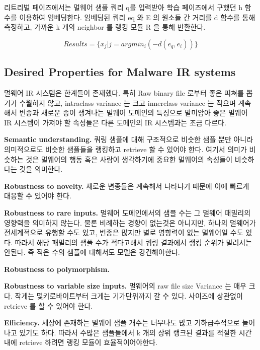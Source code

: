 리트리벌 페이즈에서는 멀웨어 샘플 쿼리 q를 입력받아 학습 페이즈에서 구했던 h 함수를 이용하여 임베딩한다. 임베딩된 쿼리 eq 와 E 의 원소들 간 거리를 d 함수를 통해 측정하고, 가까운 k 개의 neighbor 를 랭킹 모듈 R 을 통해 반환한다. 

\[
Results = \{x_j | j = argmin_i( {-d(e_q, e_i)} )  \}
\]

\subsection{Desired Properties for Malware IR systems}
멀웨어 IR 시스템은 한계들이 존재했다. 특히 Raw binary file 로부터 좋은 피쳐를 뽑기가 수월하지 않고, intraclass variance 는 크고 innerclass variance 는 작으며 계속해서 변종과 새로운 종이 생겨나는 멀웨어 도메인의 특징으로 말미암아 좋은 멀웨어 IR 시스템이 가져야 할 속성들은 다른 도메인의 IR 시스템과는 조금 다르다.

\textbf{Semantic understanding. }
쿼링 샘플에 대해 구조적으로 비슷한 샘플 뿐만 아니라 의미적으로도 비슷한 샘플들을 랭킹하고 retrieve 할 수 있어야 한다. 여기서 의미가 비슷하는 것은 멀웨어의 행동 혹은 사람이 생각하기에 중요한 멀웨어의 속성들이 비슷하다는 것을 의미한다. 


\textbf{Robustness to novelty. }
새로운 변종들은 계속해서 나타나기 때문에 이에 빠르게 대응할 수 있어야 한다. 


\textbf{Robustness to rare inputs. }
멀웨어 도메인에서의 샘플 수는 그 멀웨어 패밀리의 영향력을 의미하지 않는다. 물론 비례하는 경향이 없는것은 아니지만, 하나의 멀웨어가 전세계적으로 유행할 수도 있고, 변종은 많지만 별로 영향력이 없는 멀웨어일 수도 있다. 따라서 해당 패밀리의 샘플 수가 적다고해서 쿼링 결과에서 랭킹 순위가 밀려서는 안된다. 즉 적은 수의 샘플에 대해서도 모델은 강건해야한다. 


\textbf{Robustness to polymorphism. }


\textbf{Robustness to variable size inputs. }
멀웨어의 raw file size Variance 는 매우 크다. 작게는 몇키로바이트부터 크게는 기가단위까지 갈 수 있다. 사이즈에 상관없이 retrieve 를 할 수 있어야 한다.

\textbf{Efficiency. }
세상에 존재하는 멀웨어 샘플 개수는 너무나도 많고 기하급수적으로 늘어나고 있기도 하다. 따라서 수많은 샘플들에서 k 개의 상위 랭크된 결과를 적절한 시간 내에 retrieve 하려면 랭킹 모듈이 효율적이어야한다.

